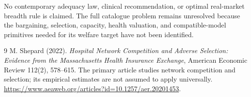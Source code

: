 \documentclass[11pt,a4paper]{article}
\begin{document}
No contemporary adequacy law, clinical recommendation, or optimal real-market breadth rule is claimed. The full catalogue problem remains unresolved because the bargaining, selection, capacity, health valuation, and compatible-model primitives needed for its welfare target have not been identified.
\begin{thebibliography}{9}
 M. Shepard (2022).
\emph{Hospital Network Competition and Adverse Selection: Evidence from the Massachusetts Health Insurance Exchange}, American Economic Review 112(2), 578--615.
The primary article studies network competition and selection; its empirical estimates are not assumed to apply universally.
\url{https://www.aeaweb.org/articles?id=10.1257/aer.20201453}.
\end{thebibliography}
\end{document}
